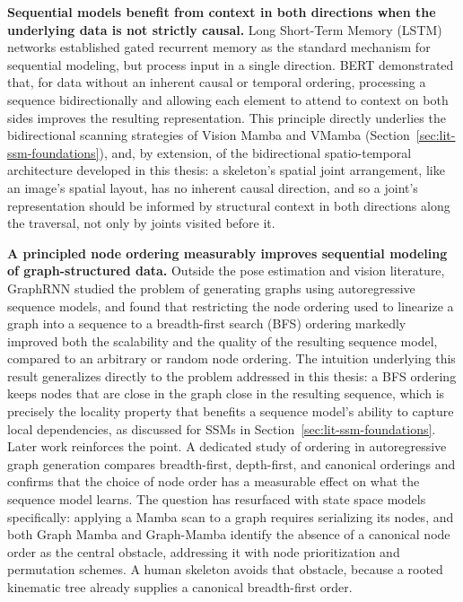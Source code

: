 \textbf{Sequential models benefit from context in both directions when
the underlying data is not strictly causal.} Long Short-Term Memory (LSTM)
networks \cite{hochreiter1997lstm} established gated recurrent memory as
the standard mechanism for sequential modeling, but process input in a
single direction. BERT \cite{devlin2019bert} demonstrated that, for data
without an inherent causal or temporal ordering, processing a sequence
bidirectionally and allowing each element to attend to context on both
sides improves the resulting representation. This principle
directly underlies the bidirectional scanning strategies of Vision Mamba
and VMamba (Section~\ref{sec:lit-ssm-foundations}), and, by extension, of
the bidirectional spatio-temporal architecture developed in this thesis: a
skeleton's spatial joint arrangement, like an image's spatial layout, has
no inherent causal direction, and so a joint's representation should be
informed by structural context in both directions along the traversal, not
only by joints visited before it.

\textbf{A principled node ordering measurably improves
sequential modeling of graph-structured data.} Outside the pose estimation
and vision literature, GraphRNN \cite{you2018graphrnn} studied the problem
of generating graphs using autoregressive sequence models, and found that
restricting the node ordering used to linearize a graph into a sequence to
a breadth-first search (BFS) ordering markedly improved both the
scalability and the quality of the resulting sequence model, compared to
an arbitrary or random node ordering. The intuition underlying this result
generalizes directly to the problem addressed in this thesis: a BFS
ordering keeps nodes that are close in the graph close in the resulting
sequence, which is precisely the locality property that benefits a
sequence model's ability to capture local dependencies, as discussed for
SSMs in Section~\ref{sec:lit-ssm-foundations}. Later work reinforces the
point. A dedicated study of ordering in autoregressive graph generation
\cite{bu2023ordering} compares breadth-first, depth-first, and canonical
orderings and confirms that the choice of node order has a measurable effect
on what the sequence model learns. The question has resurfaced with state
space models specifically: applying a Mamba scan to a graph requires
serializing its nodes, and both Graph Mamba \cite{behrouz2024graphmamba} and
Graph-Mamba \cite{wang2024graphmamba} identify the absence of a canonical
node order as the central obstacle, addressing it with node prioritization
and permutation schemes. A human skeleton avoids that obstacle, because a
rooted kinematic tree already supplies a canonical breadth-first order.

